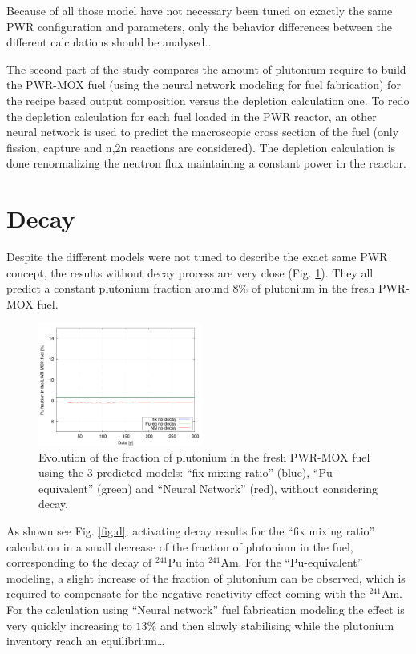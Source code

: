 \documentclass{anstrans}
\begin{document}
Because of all those model have not necessary been tuned on exactly the same
PWR configuration and parameters, only the behavior differences between the
different calculations should be analysed..


The second part of the study compares the amount of plutonium require to build
the PWR-MOX fuel (using the neural network modeling for fuel fabrication) for
the recipe based output composition versus the depletion calculation one.  To
redo the depletion calculation for each fuel loaded in the PWR reactor, an other
neural network is used to predict the macroscopic cross section of the fuel
\cite{Leniau2015125} (only fission, capture and n,2n reactions are considered).
The depletion calculation is done renormalizing the neutron flux maintaining a
constant power in the reactor.


\section{Decay}

Despite the different models were not tuned to describe the exact same PWR
concept, the results without decay process are very close (Fig. \ref{fig:nod}).
They all predict a constant plutonium fraction around $8\%$ of plutonium in the
fresh PWR-MOX fuel.

\begin{figure}[ht] %
  \centering
  \includegraphics[width=0.48\textwidth]{nodecay_pu_contribution.png}
  \caption{Evolution of the fraction of plutonium in the fresh PWR-MOX fuel
  using the 3 predicted models: ``fix mixing ratio'' (blue), ``Pu-equivalent''
  (green) and ``Neural Network'' (red), without considering decay.}
  \label{fig:nod}
\end{figure}


As shown see Fig. \ref{fig:d}, activating decay results for the ``fix mixing
ratio'' calculation in a small decrease of the fraction of plutonium in the
fuel, corresponding to the decay of $^{241}$Pu into $^{241}$Am. For the
``Pu-equivalent'' modeling, a slight increase of the fraction of plutonium can
be observed, which is required to compensate for the negative reactivity effect
coming with the $^{241}$Am. For the calculation using ``Neural network'' fuel
fabrication modeling the effect is very quickly increasing to $13\%$ and then
slowly stabilising while the plutonium inventory reach an equilibrium\ldots
\end{document}
